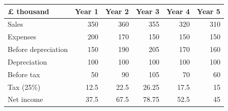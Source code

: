 \begin{tabular}{lrrrrr}\toprule
£ thousand & Year 1 & Year 2 & Year 3 & Year 4 & Year 5\\\midrule
Sales & 350 & 360 & 355 & 320 & 310\\
Expenses & 200 & 170 & 150 & 150 & 150\\
Before depreciation & 150 & 190 & 205 & 170 & 160\\
Depreciation & 100 & 100 & 100 & 100 & 100\\
Before tax & 50 & 90 & 105 & 70 & 60\\
Tax (25\%) & 12.5 & 22.5 & 26.25 & 17.5 & 15\\
Net income & 37.5 & 67.5 & 78.75 & 52.5 & 45\\
\bottomrule\end{tabular}
